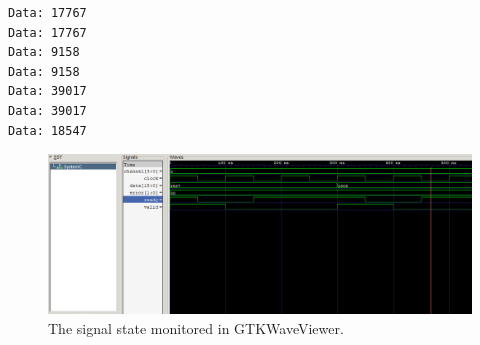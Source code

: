 \begin{lstlisting}[caption=Output at the sink., frame=single, captionpos=b, label={lst:sinkadapteroutput}]
Data: 17767
Data: 17767
Data: 9158
Data: 9158
Data: 39017
Data: 39017
Data: 18547
\end{lstlisting}

\begin{figure}[h]
	\centering
	\includegraphics[width=1\linewidth]{MasterSlaveSTGTKWaveAdapter.png}
	\caption{The signal state monitored in GTKWaveViewer.}
	\label{fig:gtkwavesignalstateadapter}
\end{figure}
